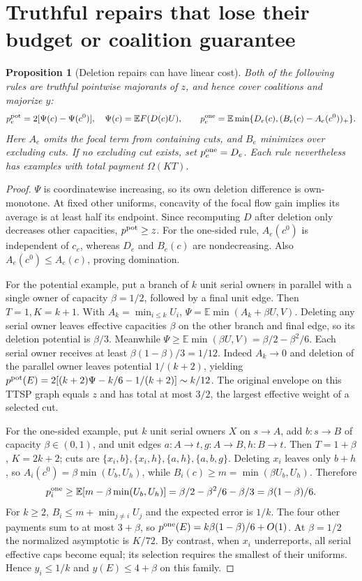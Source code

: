 \documentclass[11pt]{article}
\newtheorem{proposition}[theorem]{Proposition}
\theoremstyle{definition}\newtheorem{definition}[theorem]{Definition}
\theoremstyle{remark}\newtheorem{remark}[theorem]{Remark}
\newcommand{\E}{\mathbb E}
\begin{document}
\section{Truthful repairs that lose their budget or coalition guarantee}
\label{noise:repairs}
\begin{proposition}[Deletion repairs can have linear cost]\label{noise:deletion}
Both of the following rules are truthful pointwise majorants of $z$, and
hence cover coalitions and majorize $y$:
\[
 p_e^{\rm pot}=2[\Psi(c)-\Psi(c^0)],\quad
 \Psi(c)=\E F(D(c)U),
 \qquad
 p_e^{\rm one}=\E\min\{D_e(c),(B_e(c)-A_e(c^0))_+\}.
\]
Here $A_e$ omits the focal term from containing cuts, and $B_e$ minimizes
over excluding cuts. If no excluding cut exists, set $p_e^{\rm one}=D_e$.
Each rule nevertheless has examples with total payment $\Omega(KT)$.
\end{proposition}
\begin{proof}
$\Psi$ is coordinatewise increasing, so its own deletion difference is
own-monotone. At fixed other uniforms, concavity of the focal flow gain
implies its average is at least half its endpoint. Since recomputing $D$
after deletion only decreases other capacities, $p^{\rm pot}\ge z$.
For the one-sided rule, $A_e(c^0)$ is independent of $c_e$, whereas $D_e$
and $B_e(c)$ are nondecreasing. Also $A_e(c^0)\le A_e(c)$, proving domination.

For the potential example, put a branch of $k$ unit serial owners in parallel
with a single owner of capacity $\beta=1/2$, followed by a final unit edge.
Then $T=1,K=k+1$. With $A_k=\min_{i\le k}U_i$,
$\Psi=\E\min(A_k+\beta U,V)$. Deleting any serial owner leaves effective
capacities $\beta$ on the other branch and final edge, so its deletion
potential is $\beta/3$. Meanwhile
$\Psi\ge\E\min(\beta U,V)=\beta/2-\beta^2/6$.
Each serial owner receives at least $\beta(1-\beta)/3=1/12$.
Indeed $A_k\to0$ and deletion of the parallel owner leaves potential
$1/(k+2)$, yielding
$p^{\rm pot}(E)=2[(k+2)\Psi-k/6-1/(k+2)]\sim k/12$.
The original envelope on this TTSP graph equals $z$ and has total at most
$3/2$, the largest effective weight of a selected cut.

For the one-sided example, put $k$ unit serial owners $X$ on $s\to A$,
add $b:s\to B$ of capacity $\beta\in(0,1)$, and unit edges
$a:A\to t,g:A\to B,h:B\to t$. Then $T=1+\beta$, $K=2k+2$; cuts are
$\{x_i,b\},\{x_i,h\},\{a,h\},\{a,b,g\}$.
Deleting $x_i$ leaves only $b+h$, so
$A_i(c^0)=\beta\min(U_b,U_h)$, while
$B_i(c)\ge m=\min(\beta U_b,U_h)$. Therefore
\[
 p_i^{\rm one}\ge\E[m-\beta\min(U_b,U_h)]
 =\beta/2-\beta^2/6-\beta/3=\beta(1-\beta)/6.
\]
For $k\ge2$, $B_i\le m+\min_{j\ne i}U_j$ and the expected error is
$1/k$. The four other payments sum to at most $3+\beta$, so
$p^{\rm one}(E)=k\beta(1-\beta)/6+O(1)$.
At $\beta=1/2$ the normalized asymptotic is $K/72$.
By contrast, when $x_i$ underreports, all serial effective caps become equal;
its selection requires the smallest of their uniforms. Hence $y_i\le1/k$
and $y(E)\le4+\beta$ on this family.
\end{proof}
\end{document}

